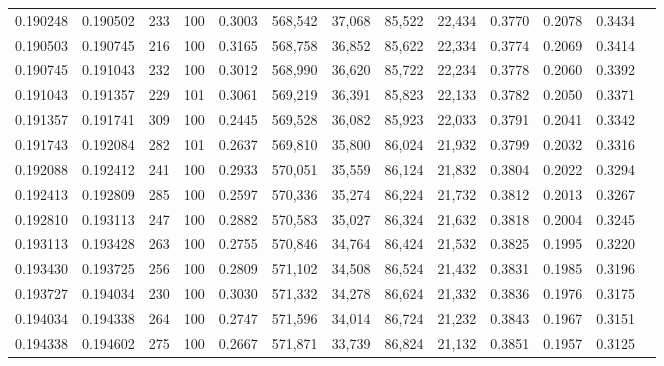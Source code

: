 \begin{tabular}{rrrrrrrrrrrrr}
0.190248 & 0.190502 &   233 & 100 &                                     0.3003 & 568,542 &  37,068 &  85,522 &  22,434 & 0.3770 & 0.2078 & 0.3434 \\
0.190503 & 0.190745 &   216 & 100 &                                     0.3165 & 568,758 &  36,852 &  85,622 &  22,334 & 0.3774 & 0.2069 & 0.3414 \\
0.190745 & 0.191043 &   232 & 100 &                                     0.3012 & 568,990 &  36,620 &  85,722 &  22,234 & 0.3778 & 0.2060 & 0.3392 \\
0.191043 & 0.191357 &   229 & 101 &                                     0.3061 & 569,219 &  36,391 &  85,823 &  22,133 & 0.3782 & 0.2050 & 0.3371 \\
0.191357 & 0.191741 &   309 & 100 &                                     0.2445 & 569,528 &  36,082 &  85,923 &  22,033 & 0.3791 & 0.2041 & 0.3342 \\
0.191743 & 0.192084 &   282 & 101 &                                     0.2637 & 569,810 &  35,800 &  86,024 &  21,932 & 0.3799 & 0.2032 & 0.3316 \\
0.192088 & 0.192412 &   241 & 100 &                                     0.2933 & 570,051 &  35,559 &  86,124 &  21,832 & 0.3804 & 0.2022 & 0.3294 \\
0.192413 & 0.192809 &   285 & 100 &                                     0.2597 & 570,336 &  35,274 &  86,224 &  21,732 & 0.3812 & 0.2013 & 0.3267 \\
0.192810 & 0.193113 &   247 & 100 &                                     0.2882 & 570,583 &  35,027 &  86,324 &  21,632 & 0.3818 & 0.2004 & 0.3245 \\
0.193113 & 0.193428 &   263 & 100 &                                     0.2755 & 570,846 &  34,764 &  86,424 &  21,532 & 0.3825 & 0.1995 & 0.3220 \\
0.193430 & 0.193725 &   256 & 100 &                                     0.2809 & 571,102 &  34,508 &  86,524 &  21,432 & 0.3831 & 0.1985 & 0.3196 \\
0.193727 & 0.194034 &   230 & 100 &                                     0.3030 & 571,332 &  34,278 &  86,624 &  21,332 & 0.3836 & 0.1976 & 0.3175 \\
0.194034 & 0.194338 &   264 & 100 &                                     0.2747 & 571,596 &  34,014 &  86,724 &  21,232 & 0.3843 & 0.1967 & 0.3151 \\
0.194338 & 0.194602 &   275 & 100 &                                     0.2667 & 571,871 &  33,739 &  86,824 &  21,132 & 0.3851 & 0.1957 & 0.3125 \\

\end{tabular}
